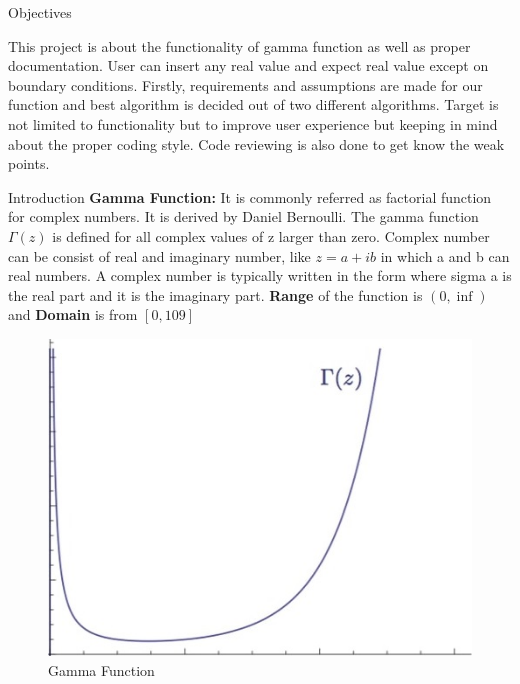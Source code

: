 \documentclass[final]{beamer}
\newlength{\onecolwid}
\begin{document}
\begin{frame}
\begin{columns}[t]
\begin{column}{\onecolwid}
\begin{exampleblock}{Objectives}

\small{This project is about the functionality of gamma function as well as proper documentation. User can insert any real value and expect real value except on boundary conditions. Firstly, requirements and assumptions are made for our function and best algorithm is decided out of two different algorithms. Target is not limited to functionality but to improve user experience but keeping in mind about the proper coding style. Code reviewing is also done to get know the weak points. }

\end{exampleblock}


\begin{exampleblock}{Introduction}
\small{\textbf{Gamma Function: } It is commonly referred as factorial function for complex numbers. It is derived by Daniel Bernoulli. The gamma function $\Gamma(z)$ is defined for all complex values of z larger than zero. Complex number can be consist of real and imaginary number, like $z = a + i b$ in which a and b can real numbers. A complex number is typically written in the form where sigma a is the real part and it is the imaginary part. \textbf{Range} of the function is $(0,\inf)$ and \textbf{Domain} is from $[0, 109]$}
\end{exampleblock}


\begin{figure}
\includegraphics[width=0.5\linewidth]{img/d4_2.jpg}
\caption{Gamma Function}
\label{fig:Gamma Function}
\end{figure}


\end{column}
\end{columns}
\end{frame}
\end{document}
